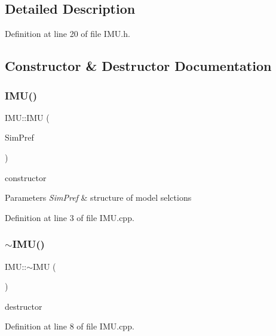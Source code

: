 \subsection{Detailed Description}


Definition at line 20 of file I\+M\+U.\+h.



\subsection{Constructor \& Destructor Documentation}
\mbox{\label{class_i_m_u_a306cae49e477064988b1bf6d497213c6}} 
\subsubsection{\texorpdfstring{I\+M\+U()}{IMU()}}
{\footnotesize\ttfamily I\+M\+U\+::\+I\+MU (\begin{DoxyParamCaption}\item[{Sim\+D\+Preference \&}]{Sim\+Pref }\end{DoxyParamCaption})}



constructor 


\begin{DoxyParams}{Parameters}
{\em Sim\+Pref} & structure of model selctions \\
\hline
\end{DoxyParams}


Definition at line 3 of file I\+M\+U.\+cpp.

\mbox{\label{class_i_m_u_ad1f213d1e6aa08988ff683feab721559}} 
\subsubsection{\texorpdfstring{$\sim$\+I\+M\+U()}{~IMU()}}
{\footnotesize\ttfamily I\+M\+U\+::$\sim$\+I\+MU (\begin{DoxyParamCaption}{ }\end{DoxyParamCaption})}



destructor 



Definition at line 8 of file I\+M\+U.\+cpp.



